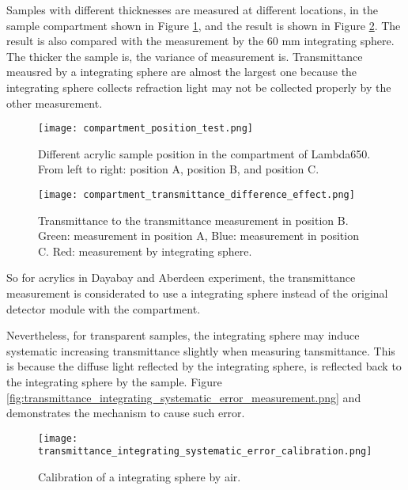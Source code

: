 

Samples with different thicknesses are measured at different locations, in the sample compartment shown in Figure \ref{compartment_position_test.png},
and the result is shown in Figure \ref{compartment_transmittance_difference_effect.png}.
The result is also compared with the measurement by the 60 mm integrating sphere.
The thicker the sample is, the variance of
measurement is. Transmittance meausred by a integrating sphere
are almost the largest one because the integrating sphere collects refraction light may
not be collected properly by the other measurement.

\begin{figure}
    \centering
    \texttt{[image: compartment\_position\_test.png]}
    \caption{Different acrylic sample position in the compartment of Lambda650. From
 left to right: position A, position B, and position C.}
    \label{compartment_position_test.png}
    \end{figure}


\begin{figure}
    \centering
    \texttt{[image: compartment\_transmittance\_difference\_effect.png]}
    \caption{Transmittance to the transmittance measurement in position B. Green: measurement in position A, Blue:
 measurement in position C. Red: measurement by integrating sphere.}
    \label{compartment_transmittance_difference_effect.png}
    \end{figure}


So for acrylics in Dayabay and Aberdeen experiment, the transmittance measurement is
considerated to use a integrating sphere instead of the original detector module with the compartment.

Nevertheless, for transparent samples, the integrating sphere
may induce systematic increasing transmittance slightly when measuring tansmittance.
This is because the diffuse light reflected by the integrating
sphere, is reflected back to the integrating sphere by the sample.
Figure \ref{fig:transmittance_integrating_systematic_error_measurement.png} and
demonstrates the mechanism to cause such error.


\begin{figure}
    \centering
    \texttt{[image: transmittance\_integrating\_systematic\_error\_calibration.png]}
    \caption{Calibration of a integrating sphere by air.}
    \label{fig:transmittance_integrating_systematic_error_calibration.png}
    \end{figure}


